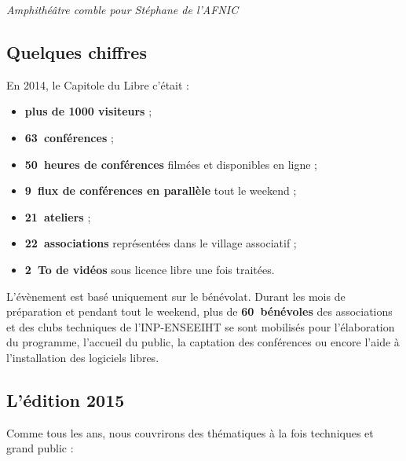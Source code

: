 \begin{center}
\textit{Amphithéâtre comble pour Stéphane  de l'AFNIC}
\end{center}

\subsection{Quelques chiffres}

\begin{minipage}{0.6\textwidth}
En 2014, le Capitole du Libre c'était :
\begin{itemize}[label=$\bullet$]
\item \textbf{plus de \num{1000} visiteurs} ;
\item \textbf{63~conférences} ;
\item \textbf{50~heures de conférences} filmées et disponibles en ligne ;
\item \textbf{9~flux de conférences en parallèle} tout le weekend ;
\item \textbf{21~ateliers} ;
\item \textbf{22~associations} représentées dans le village associatif ;
\item \textbf{\SI{2}{\tera o} de vidéos} sous licence libre une fois traitées.
\end{itemize}
\end{minipage}
\begin{minipage}{0.4\textwidth}
\begin{center}
\end{center}
\end{minipage}

\Separateur

L’évènement est basé uniquement sur le bénévolat.
 Durant les mois de préparation et pendant tout le weekend,
 plus de \textbf{60~bénévoles} des associations et des clubs techniques
 de l’INP-ENSEEIHT se sont mobilisés pour l’élaboration du programme,
 l’accueil du public, la captation des conférences ou encore l’aide
 à l’installation des logiciels libres.


\subsection{L'édition 2015}

Comme tous les ans, nous couvrirons des thématiques à la fois techniques et grand 
public :

